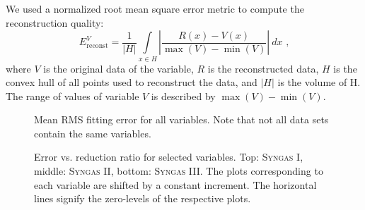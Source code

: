 %
%
We used a normalized root mean square error metric to compute the reconstruction
quality:
%
\begin{equation*}
	E^V_\text{reconst}
		= 	\frac{1}{|H|}
			\int\limits_{x \in H} 			
				\left|
					\frac{R(x) - V(x)}{\max(V)-\min(V)}
				\right| ~dx
			 \text{ ,}
\end{equation*}
%
where $V$ is the original data of the variable, $R$ is the reconstructed data,
$H$ is the convex hull of all points used to reconstruct the data, and $|H|$ is
the volume of H. The range of values of variable $V$ is described by
$\max(V)-\min(V)$.

%
\begin{figure}[t]
	\centering
	\setlength\figureheight{0.2\textheight}
	\setlength{}
	
	\caption{Mean RMS fitting error for all variables. Note that not all data sets
	contain the same variables.}
	\label{fig:fitting_rms_error}
\end{figure}
%
%
\begin{figure}[p]
	\setlength\figureheight{0.26\textheight}
	\setlength{}
	
	\caption{
	Error vs. reduction ratio for selected variables. Top: \textsc{Syngas I},
	middle: \textsc{Syngas II}, bottom: \textsc{Syngas III}. The plots
	corresponding to each variable are shifted by a constant increment. The
	horizontal lines signify the zero-levels of the respective plots.}
	\label{fig:CRvMSE}
\end{figure}

